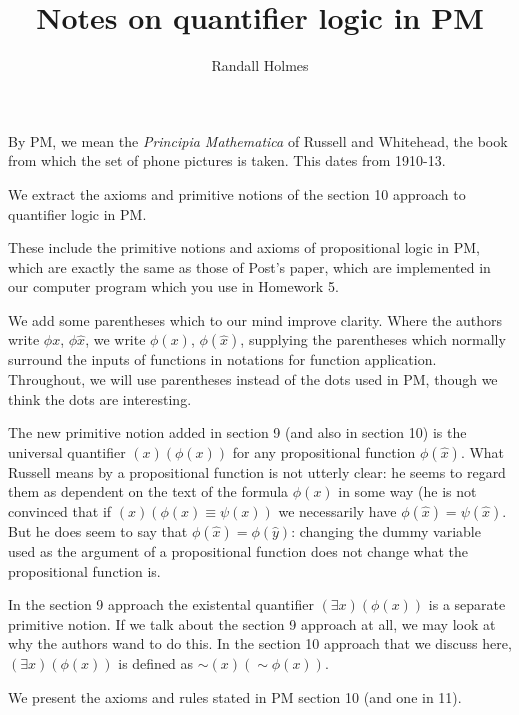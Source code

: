 \documentclass[12pt]{article}
\title{Notes on quantifier logic in PM}
\author{Randall Holmes}
\begin{document}
\maketitle

By PM, we mean the {\em Principia Mathematica\/} of Russell and Whitehead, the book from which the set of phone pictures is taken.  This dates from 1910-13.

We extract the axioms and primitive notions of the section 10 approach to quantifier logic in PM.

These include the primitive notions and axioms of propositional logic in PM, which are exactly the same as those of Post's paper, which are implemented in our 
computer program which you use in Homework 5.

We add some parentheses which to our mind improve clarity.  Where the authors write $\phi x$, $\phi \hat{x}$, we write $\phi(x)$, $\phi(\hat{x})$, supplying the parentheses which normally surround the inputs of functions in notations for function application.  Throughout, we will use parentheses instead of the dots used in PM, though we think the dots are interesting.

The new primitive notion added in section 9 (and also in section 10) is the universal quantifier $(x)(\phi(x))$ for any propositional function $\phi(\hat{x})$.  What Russell means by a propositional function is not utterly clear:  he seems to regard them as dependent on the text of the formula $\phi(x)$ in some way (he is not convinced that if $(x)(\phi(x) \equiv \psi(x))$ we necessarily have
$\phi(\hat{x}) = \psi(\hat{x})$.  But he does seem to say that $\phi(\hat{x}) = \phi(\hat{y})$:  changing the dummy variable used as the argument of a propositional function does not
change what the propositional function is.

In the section 9 approach the existental quantifier $(\exists x)(\phi(x))$ is a separate primitive notion.  If we talk about the section 9 approach at all, we may look at why
the authors wand to do this.  In the section 10 approach that we discuss here, $(\exists x)(\phi(x))$ is defined as $\sim (x)(\sim \phi(x))$.

We present the axioms and rules stated in PM section 10 (and one in 11).
\end{document}
